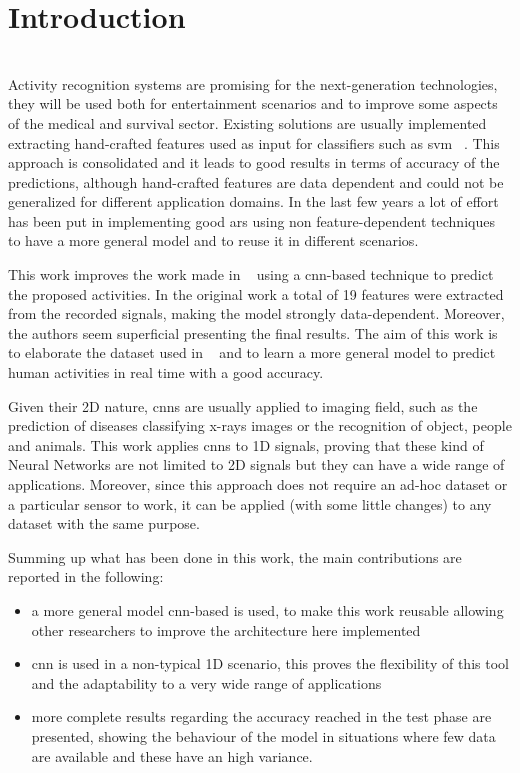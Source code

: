 
\section{Introduction}
\label{sec:introduction}

\\

Activity recognition systems are promising for the next-generation technologies, they will be used both for entertainment scenarios and to improve some aspects of the medical and survival sector.
Existing solutions are usually implemented extracting hand-crafted features used as input for classifiers such as \gls{svm} ~\cite{Elvira14, Hamalainen11, Khan10}.
This approach is consolidated and it leads to good results in terms of accuracy of the predictions, although hand-crafted features are data dependent and could not be generalized for different application domains.
In the last few years a lot of effort has been put in implementing good \gls{ars} using non feature-dependent techniques to have a more general model and to reuse it in different scenarios.

This work improves the work made in ~\cite{Frank10} using a \gls{cnn}-based technique to predict the proposed activities.
In the original work a total of 19 features were extracted from the recorded signals, making the model strongly data-dependent.
Moreover, the authors seem superficial presenting the final results.
The aim of this work is to elaborate the dataset used in ~\cite{Frank10} and to learn a more general model to predict human activities in real time with a good accuracy.

Given their 2D nature, \glspl{cnn} are usually applied to imaging field, such as the prediction of diseases classifying x-rays images or the recognition of object, people and animals.
This work applies \glspl{cnn} to 1D signals, proving that these kind of Neural Networks are not limited to 2D signals but they can have a wide range of applications.
Moreover, since this approach does not require an ad-hoc dataset or a particular sensor to work, it can be applied (with some little changes) to any dataset with the same purpose.

Summing up what has been done in this work, the main contributions are reported in the following:
\begin{itemize}
\item a more general model \gls{cnn}-based is used, to make this work reusable allowing other researchers to improve the architecture here implemented
\item \gls{cnn} is used in a non-typical 1D scenario, this proves the flexibility of this tool and the adaptability to a very wide range of applications
\item more complete results regarding the accuracy reached in the test phase are presented, showing the behaviour of the model in situations where few data are available and these have an high variance.
\end{itemize}

